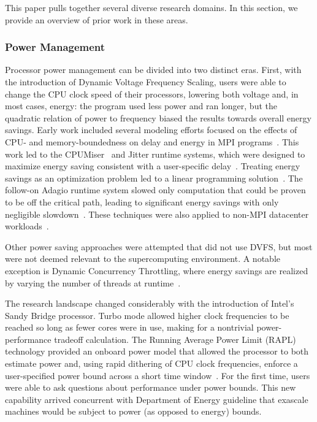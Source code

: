 This paper pulls together several diverse research domains. In this section,
we provide an overview of prior work in these areas.

\subsubsection{Power Management}
Processor power management can be divided into two distinct eras. First, with 
the introduction of Dynamic Voltage Frequency Scaling, users were able to 
change the CPU clock speed of their processors, lowering both voltage and,
in most cases, energy: the program used less power and ran longer, but the
quadratic relation of power to frequency biased the results towards overall
energy savings. Early work included several modeling efforts focused on
the effects of CPU- and memory-boundedness on delay and energy in MPI programs~\cite{SpringerPPoPP2006,GeICPP2007,LiHPCA2006,CameronSC2005,HsuSC2005}. 
This work led to the CPUMiser~\cite{GeICPP2007} and Jitter runtime systems, which were designed 
to maximize energy saving consistent with a user-specific delay~\cite{KappiahSC2005}.
Treating energy savings as an optimization problem led to a linear programming
solution~\cite{rountree:07}. The follow-on Adagio runtime system slowed only
computation that could be proven to be off the critical path, leading to significant
energy savings with only negligible slowdown~\cite{rountree:09}. These 
techniques were also applied to non-MPI datacenter workloads~\cite{femal:04}. 

Other power saving approaches were attempted that did not use DVFS, but most
were not deemed relevant to the supercomputing environment. A notable exception
is Dynamic Concurrency Throttling, where energy savings are realized by varying
the number of threads at runtime~\cite{Curtis1,Curtis2,Curtis3}.

The research landscape changed considerably with the introduction of Intel's
Sandy Bridge processor. Turbo mode allowed higher clock frequencies to be
reached so long as fewer cores were in use, making for a nontrivial power- performance tradeoff
calculation. The Running Average Power Limit (RAPL) technology provided an onboard power model that allowed the processor to both
estimate power and, using rapid dithering of CPU clock frequencies, enforce a
user-specified power bound across a short time window~\cite{IntelSDM,David2010}. 
For the first time, users were able to ask questions about performance under 
power bounds. This new capability arrived concurrent with Department of Energy
guideline that exascale machines would be subject to power (as opposed to energy) bounds.

